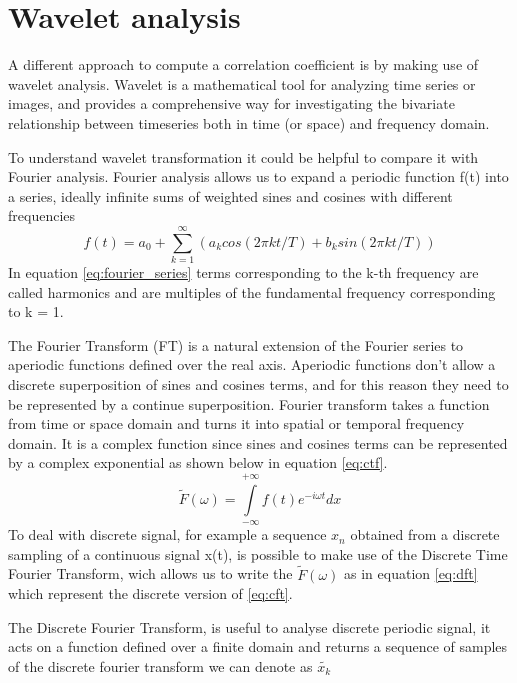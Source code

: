 \documentclass[10pt]{report}
\begin{document}
\section{Wavelet analysis}
A different approach to compute a correlation coefficient is by making use of wavelet analysis.\cite{ferrante-2015} \cite{vandenberg-1999}
Wavelet is a mathematical tool for analyzing time series or images, and provides a comprehensive way for investigating the bivariate relationship between timeseries both in time (or space) and frequency domain.

To understand wavelet transformation it could be helpful to compare it with Fourier analysis.
Fourier analysis allows us to expand a periodic function f(t) into a series, ideally infinite sums of weighted sines and cosines with different frequencies
\begin{equation}\label{eq:fourier_series}
f(t) = a_0 + \sum_{k = 1}^\infty (a_k cos(2\pi k t/T) + b_k sin (2\pi k t /T))
\end{equation}
In equation \ref{eq:fourier_series} terms corresponding to the k-th frequency are called harmonics and are multiples of the fundamental frequency corresponding to k = 1.

The Fourier Transform (FT) is a natural extension of the Fourier series to aperiodic functions defined over the real axis.
Aperiodic functions don't allow a discrete superposition of sines and cosines terms, and for this reason they need to be represented by a continue superposition.
Fourier transform takes a function from time or space domain and turns it into spatial or temporal frequency domain.
It is a complex function since sines and cosines terms can be represented by a complex exponential as shown below in equation \ref{eq:ctf}.
\begin{equation}\label{eq:cft}
\tilde{F}(\omega) = \int\limits_{-\infty}^{+\infty} f(t)e^{-i \omega t} dx
\end{equation}
To deal with discrete signal, for example a sequence $x_n$ obtained from a discrete sampling of a continuous signal x(t), is possible to make use of the Discrete Time Fourier Transform, wich allows us to write the $\tilde F(\omega)$ as in equation \ref{eq:dft} which represent the discrete version of \ref{eq:cft}.

The Discrete Fourier Transform, is useful to analyse discrete periodic signal, it acts on a function defined over a finite domain and returns a sequence of samples of the discrete fourier transform we can denote as $\tilde{x_k}$
\end{document}
